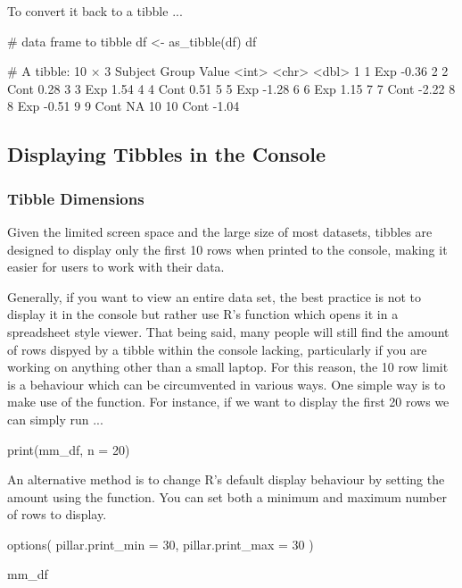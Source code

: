 \noindent
To convert it back to a tibble ...
\begin{inR}
# data frame to tibble
df <- as_tibble(df)
df
\end{inR}
\begin{outR}
# A tibble: 10 × 3
   Subject Group Value
     <int> <chr> <dbl>
 1       1 Exp   -0.36
 2       2 Cont   0.28
 3       3 Exp    1.54
 4       4 Cont   0.51
 5       5 Exp   -1.28
 6       6 Exp    1.15
 7       7 Cont  -2.22
 8       8 Exp   -0.51
 9       9 Cont  NA   
10      10 Cont  -1.04
\end{outR}

\subsection{Displaying Tibbles in the Console}

\subsubsection{Tibble Dimensions}

Given the limited screen space and the large size of most datasets, tibbles are designed to display only the first 10 rows when printed to the console, making it easier for users to work with their data.

Generally, if you want to view an entire data set, the best practice is not to display it in the console but rather use R's  function which opens it in a spreadsheet style viewer. That being said, many people will still find the amount of rows dispyed by a tibble within the console lacking, particularly if you are working on anything other than a small laptop. For this reason, the 10 row limit is a behaviour which can be circumvented in various ways. One simple way is to make use of the  function. For instance, if we want to display the first 20 rows we can simply run ...

\begin{inR}
print(mm_df, n = 20)
\end{inR}

\vspace{1em}

An alternative method is to change R's default display behaviour by setting the amount using the  function. You can set both a minimum and maximum number of rows to display.

\begin{inR}
options(
  pillar.print_min = 30,
  pillar.print_max = 30
)

mm_df
\end{inR}

